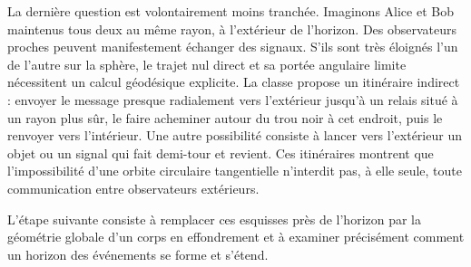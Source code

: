 La dernière question est volontairement moins tranchée. Imaginons Alice et Bob maintenus tous deux au même rayon, à l’extérieur de l’horizon. Des observateurs proches peuvent manifestement échanger des signaux. S’ils sont très éloignés l’un de l’autre sur la sphère, le trajet nul direct et sa portée angulaire limite nécessitent un calcul géodésique explicite. La classe propose un itinéraire indirect : envoyer le message presque radialement vers l’extérieur jusqu’à un relais situé à un rayon plus sûr, le faire acheminer autour du trou noir à cet endroit, puis le renvoyer vers l’intérieur. Une autre possibilité consiste à lancer vers l’extérieur un objet ou un signal qui fait demi-tour et revient. Ces itinéraires montrent que l’impossibilité d’une orbite circulaire tangentielle n’interdit pas, à elle seule, toute communication entre observateurs extérieurs.

\begin{classroomqa}
\end{classroomqa}

L’étape suivante consiste à remplacer ces esquisses près de l’horizon par la géométrie globale d’un corps en effondrement et à examiner précisément comment un horizon des événements se forme et s’étend.